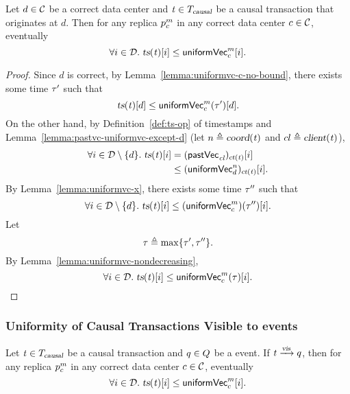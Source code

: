 \begin{applemma} \label{lemma:uniformity-correct-dc}
  Let $d \in \mathcal{C}$ be a correct data center
  and $\mathit{t} \in T_{\textsl{causal}}$ be a causal transaction
  that originates at $d$.
  Then for any replica $p^{m}_{c}$
  in any correct data center $c \in \mathcal{C}$, eventually
  \[
    \forall i \in \mathcal{D}.\; \textsl{ts}(\mathit{t})[i] \le {\sf uniformVec}^{m}_{c}[i].
  \]
\end{applemma}

\begin{proof} \label{proof:uniformity-correct-dc}
  Since $d$ is correct, by Lemma~\ref{lemma:uniformvc-c-no-bound},
  there exists some time $\tau'$ such that
  \[
    \textsl{ts}(\mathit{t})[d] \le {\sf uniformVec}^{m}_{c}(\tau')[d].
  \]
  On the other hand,
  by Definition~\ref{def:ts-op} of timestamps
  and Lemma~\ref{lemma:pastvc-uniformvc-except-d}
  (let $n \triangleq \textsl{coord}(\mathit{t})$ and $cl \triangleq \textsl{client}(\mathit{t})$),
  \begin{align*}
    \forall i \in \mathcal{D} \setminus \{d\}.\;
      \textsl{ts}(\mathit{t})[i] &= ({\sf pastVec}_{\mathit{cl}})_{\textsl{ct}(\mathit{t})}[i] \\
      &\le ({\sf uniformVec}^{n}_{d})_{\textsl{ct}(\mathit{t})}[i].
  \end{align*}
  By Lemma~\ref{lemma:uniformvc-x},
  there exists some time $\tau''$ such that
  \[
    \forall i \in \mathcal{D} \setminus \{d\}.\;
      \textsl{ts}(\mathit{t})[i] \le ({\sf uniformVec}^{m}_{c})(\tau'')[i].
  \]
  Let
  \[
    \tau \triangleq \max\{\tau', \tau''\}.
  \]
  By Lemma~\ref{lemma:uniformvc-nondecreasing},
  \[
    \forall i \in \mathcal{D}.\; \textsl{ts}(\mathit{t})[i] \le {\sf uniformVec}^{m}_{c}(\tau)[i].
  \]
\end{proof}
\subsubsection{Uniformity of Causal Transactions Visible to \fence{} events}
\label{sss:uniformity-fences}

\begin{applemma} \label{lemma:uniformity-causal-fence}
  Let $\mathit{t} \in T_{\textsl{causal}}$ be a causal transaction
  and $q \in Q$ be a \fence{} event.
  If $\mathit{t} \xrightarrow{\textsl{vis}} q$,
  then for any replica $p^{m}_{c}$
  in any correct data center $c \in \mathcal{C}$, eventually
  \[
    \forall i \in \mathcal{D}.\; \textsl{ts}(\mathit{t})[i] \le {\sf uniformVec}^{m}_{c}[i].
  \]
\end{applemma}

